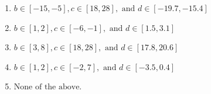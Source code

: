 \documentclass[14pt]{extbook}
\begin{document}
\begin{enumerate}
{\begin{enumerate}[label=\Alph*.]
\item \( b \in [-15, -5], c \in [18, 28], \text{ and } d \in [-19.7, -15.4] \)
\item \( b \in [1, 2], c \in [-6, -1], \text{ and } d \in [1.5, 3.1] \)
\item \( b \in [3, 8], c \in [18, 28], \text{ and } d \in [17.8, 20.6] \)
\item \( b \in [1, 2], c \in [-2, 7], \text{ and } d \in [-3.5, 0.4] \)
\item \( \text{None of the above.} \)

\end{enumerate} }
\end{enumerate}
\end{document}
